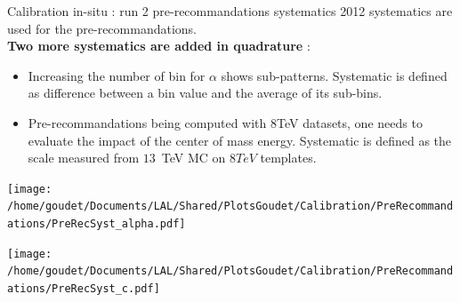 
\begin{frame}{Calibration in-situ : run 2 pre-recommandations systematics}
2012 systematics are used for the pre-recommandations. \\
{\bf Two more systematics are added in quadrature } :
\begin{itemize}
\item Increasing the number of bin for $\alpha$ shows sub-patterns. 
  Systematic is defined as difference between a bin value and the average of its sub-bins.
\item Pre-recommandations being computed with 8TeV datasets, one needs to evaluate the impact of the center of mass energy.
Systematic is defined as the scale measured from $13$~TeV MC on $8TeV$ templates.
\end{itemize}
  \begin{minipage}{0.49\linewidth}
    \texttt{[image: /home/goudet/Documents/LAL/Shared/PlotsGoudet/Calibration/PreRecommandations/PreRecSyst\_alpha.pdf]}
  \end{minipage}
  \hfill
  \begin{minipage}{0.49\linewidth}
    \texttt{[image: /home/goudet/Documents/LAL/Shared/PlotsGoudet/Calibration/PreRecommandations/PreRecSyst\_c.pdf]}
  \end{minipage}\\
\end{frame}

